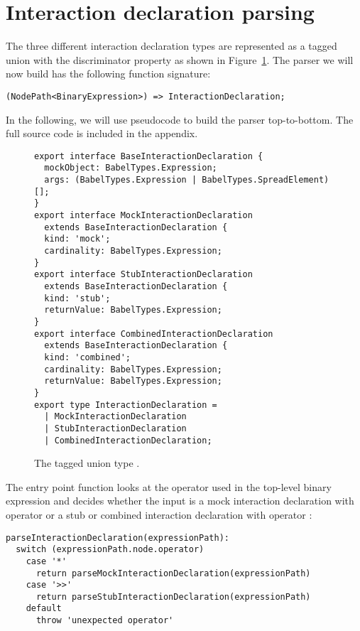 \section{Interaction declaration parsing}
The three different interaction declaration types
are represented as a tagged union 
with the discriminator property 
as shown in Figure~\ref{fig:InteractionDeclarationType}.
The parser we will now build has the following function signature:
\begin{verbatim}
(NodePath<BinaryExpression>) => InteractionDeclaration;
\end{verbatim}
In the following, we will use pseudocode to build the parser top-to-bottom.
The full source code is included in the appendix.

\begin{figure}
  \begin{verbatim}
export interface BaseInteractionDeclaration {
  mockObject: BabelTypes.Expression;
  args: (BabelTypes.Expression | BabelTypes.SpreadElement)[];
}
export interface MockInteractionDeclaration
  extends BaseInteractionDeclaration {
  kind: 'mock';
  cardinality: BabelTypes.Expression;
}
export interface StubInteractionDeclaration
  extends BaseInteractionDeclaration {
  kind: 'stub';
  returnValue: BabelTypes.Expression;
}
export interface CombinedInteractionDeclaration
  extends BaseInteractionDeclaration {
  kind: 'combined';
  cardinality: BabelTypes.Expression;
  returnValue: BabelTypes.Expression;
}
export type InteractionDeclaration =
  | MockInteractionDeclaration
  | StubInteractionDeclaration
  | CombinedInteractionDeclaration;
  \end{verbatim}
  \caption{
    The tagged union type .
  }\label{fig:InteractionDeclarationType}
\end{figure}

The entry point function 
looks at the operator used in the top-level binary expression
and decides whether the input is
a mock interaction declaration with operator 
or a stub or combined interaction declaration with operator :
  \begin{verbatim}
parseInteractionDeclaration(expressionPath):
  switch (expressionPath.node.operator)
    case '*'
      return parseMockInteractionDeclaration(expressionPath)
    case '>>'
      return parseStubInteractionDeclaration(expressionPath)
    default
      throw 'unexpected operator'
\end{verbatim}

